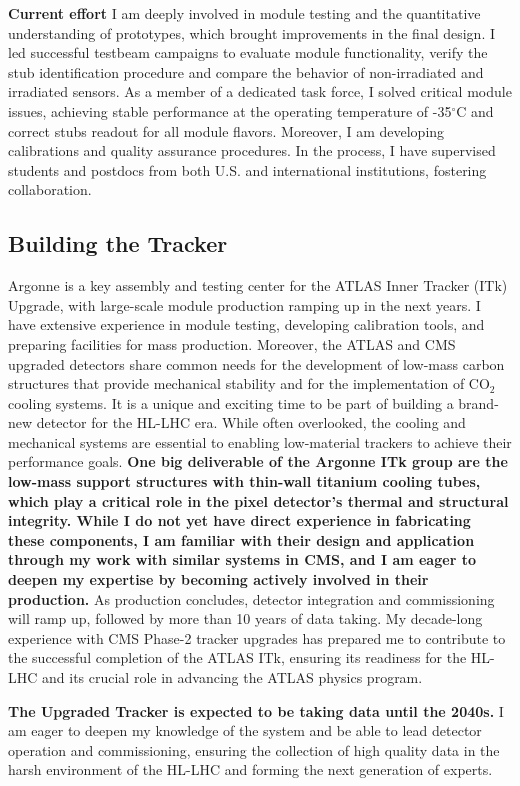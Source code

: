 {\begin{flushleft}
\textbf{Current effort}
I am deeply involved in module testing and the quantitative understanding of prototypes, which brought improvements in the final design. I led successful testbeam campaigns to evaluate module functionality, verify the stub identification procedure and compare the behavior of non-irradiated and irradiated sensors. As a member of a dedicated task force, I solved critical module issues, achieving stable performance at the operating temperature of -35$^{\circ}$C and correct stubs readout for all module flavors. Moreover, I am developing calibrations and quality assurance procedures. In the process, I have supervised students and postdocs from both U.S. and international institutions, fostering collaboration.
\vskip 5pt 
\subsection{Building the Tracker}
\vskip 5pt 
Argonne is a key assembly and testing center for the ATLAS Inner Tracker (ITk) Upgrade, with large-scale module production ramping up in the next years. I have extensive experience in module testing, developing calibration tools, and preparing facilities for mass production. Moreover, the ATLAS and CMS upgraded detectors share common needs for the development of low-mass carbon structures that provide mechanical stability and for the implementation of CO$_2$ cooling systems. 
It is a unique and exciting time to be part of building a brand-new detector for the HL-LHC era. While often overlooked, the cooling and mechanical systems are essential to enabling low-material trackers to achieve their performance goals. {\bf One big deliverable of the Argonne ITk group are the low-mass support structures with thin-wall titanium cooling tubes, which play a critical role in the pixel detector’s thermal and structural integrity. While I do not yet have direct experience in fabricating these components, I am familiar with their design and application through my work with similar systems in CMS, and I am eager to deepen my expertise by becoming actively involved in their production.}
As production concludes, detector integration and commissioning will ramp up, followed by more than 10 years of data taking. My decade-long experience with CMS Phase-2 tracker upgrades has prepared me to contribute to the successful completion of the ATLAS ITk, ensuring its readiness for the HL-LHC and its crucial role in advancing the ATLAS physics program.

{\bf The Upgraded Tracker is expected to be taking data until the 2040s.} I am eager to deepen my knowledge of the system and be able to lead detector operation and commissioning, ensuring the collection of high quality data in the harsh environment of the HL-LHC and forming the next generation of experts.


\end{flushleft}}
